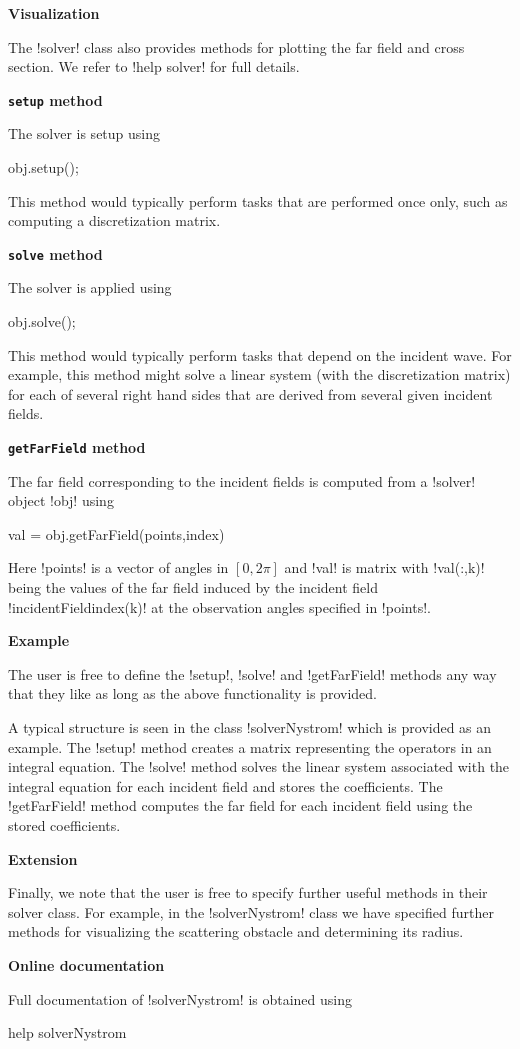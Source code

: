 \documentclass[12pt,letterpaper,final]{article}
\newcommand{\techheading}[1]{%
    \par\vspace{-0.3\parskip}\noindent\hspace{-1cm}\textbf{#1}%
    \par\vspace{-0.5\parskip}\noindent\nopagebreak\ignorespaces}
\begin{document}
\techheading{Visualization}
The !solver! class also provides methods for plotting the far field and 
cross section. We refer to !help solver! for full details.

\techheading{\texttt{setup} method}
The solver is setup using
\begin{matlab}
obj.setup();
\end{matlab}
This method would typically perform tasks that are performed once only,
such as computing a discretization matrix.

\techheading{\texttt{solve} method}
The solver is applied using
\begin{matlab}
obj.solve();
\end{matlab}
This method would typically perform tasks that
depend on the incident wave.
For example, this method might solve a linear system 
(with the discretization matrix)
for each of several right hand sides that are derived from several given incident fields.

\techheading{\texttt{getFarField} method}
The far field corresponding to the incident fields 
is computed from
a !solver! object !obj! using
\begin{matlab}
val = obj.getFarField(points,index)
\end{matlab}
Here !points! is a vector of angles in $[0,2 \pi]$ 
and
!val! is matrix with !val(:,k)! being the values of the far field
induced by the incident field !incidentField{index(k)}! at
the observation angles specified in !points!.

\techheading{Example}
The user is free to define the !setup!, !solve! 
and !getFarField! methods any way that they like as long as the above 
functionality is provided.

A typical structure is seen in the class !solverNystrom! which is provided as
an example.
The !setup! method creates a matrix representing the operators in an 
integral equation.
The !solve! method solves the linear system associated with the
integral equation for each 
incident field and stores the coefficients.
The !getFarField! method computes the far field for each incident field
using the stored coefficients.

\techheading{Extension}
Finally, we note that the user is free to specify further useful methods in their
solver class.
For example, in the !solverNystrom! class we have specified further methods for
visualizing the scattering obstacle and determining its radius.

\techheading{Online documentation}
Full documentation of !solverNystrom! is obtained using
\begin{matlab}
help solverNystrom
\end{matlab}
\end{document}
